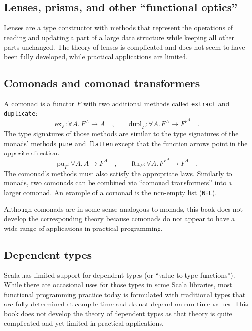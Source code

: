 \subsection{Lenses, prisms, and other \textquotedblleft functional optics\textquotedblright}

Lenses are a type constructor with methods that represent the operations
of reading and updating a part of a large data structure while keeping
all other parts unchanged. The theory of lenses is complicated and
does not seem to have been fully developed, while practical applications
are limited.

\subsection{Comonads and comonad transformers}

A comonad is a functor $F$ with two additional methods called \lstinline!extract!
and \lstinline!duplicate!:
\[
\text{ex}_{F}:\forall A.\,F^{A}\rightarrow A\quad,\quad\quad\text{dupl}_{F}:\forall A.\,F^{A}\rightarrow F^{F^{A}}\quad.
\]
The type signatures of those methods are similar to the type signatures
of the monads\textsf{'} methods \lstinline!pure! and \lstinline!flatten!
except that the function arrows point in the opposite direction:
\[
\text{pu}_{F}:\forall A.\,A\rightarrow F^{A}\quad,\quad\quad\text{ftn}_{F}:\forall A.\,F^{F^{A}}\rightarrow F^{A}\quad.
\]
The comonad\textsf{'}s methods must also satisfy the appropriate laws. Similarly
to monads, two comonads can be combined via \textsf{``}comonad transformers\textsf{''}
into a larger comonad. An example of a comonad is the non-empty list
(\lstinline!NEL!). 

Although comonads are in some sense analogous to monads, this book
does not develop the corresponding theory because comonads do not
appear to have a wide range of applications in practical programming.

\subsection{Dependent types}

Scala has limited support for dependent types
(or \textsf{``}value-to-type functions\textsf{''}). While there are occasional uses
for those types in some Scala libraries, most functional programming
practice today is formulated with traditional types that are fully
determined at compile time and do not depend on run-time values. This
book does not develop the theory of dependent types as that theory
is quite complicated and yet limited in practical applications.

